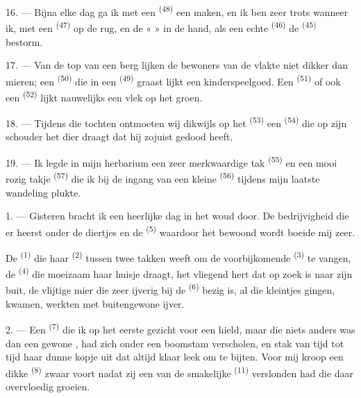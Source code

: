 \VUsaut{3.0mm}

16. --- Bijna elke dag ga ik met een  \textsuperscript{(48)} een
 maken, en ik ben zeer trots wanneer ik, met een 
\textsuperscript{(47)} op de rug, en de «  » in de hand, als een echte
 \textsuperscript{(46)} de  \textsuperscript{(45)} bestorm.

17. --- Van de top van een berg lijken de bewoners van de vlakte niet dikker dan mieren; een
 \textsuperscript{(50)} die in een
 \textsuperscript{(49)} graast lijkt een kinderspeelgoed. Een
 \textsuperscript{(51)} of ook een 
\textsuperscript{(52)} lijkt nauwelijks een vlek op het groen.

18. --- Tijdens die tochten ontmoeten wij dikwijls op het  \textsuperscript{(53)}
een  \textsuperscript{(54)} die op zijn schouder het dier draagt dat hij
zojuist gedood heeft.

19. --- Ik legde in mijn herbarium een zeer merkwaardige tak 
\textsuperscript{(55)} en een mooi rozig takje  \textsuperscript{(57)} die ik
bij de ingang van een kleine  \textsuperscript{(56)} tijdens mijn laatste
wandeling plukte.

\VUsaut{3.0mm}
\VUsaut{3.0mm}

\VUsaut{3.0mm}

1. --- Gisteren bracht ik een heerlijke dag in het woud door. De bedrijvigheid die er heerst
onder de diertjes en de  \textsuperscript{(5)} waardoor het bewoond wordt
boeide mij zeer.

De  \textsuperscript{(1)} die haar  \textsuperscript{(2)} tussen twee
takken weeft om de voorbijkomende
 \textsuperscript{(3)} te vangen, de 
\textsuperscript{(4)} die moeizaam haar huisje draagt, het vliegend hert dat op zoek is naar
zijn buit, de vlijtige mier die zeer ijverig bij de
 \textsuperscript{(6)} bezig is, al die kleintjes gingen,
kwamen, werkten met buitengewone ijver.

2. --- Een  \textsuperscript{(7)} die ik op het eerste gezicht voor een
 hield, maar die niets anders was dan een gewone
, had zich onder een boomstam verscholen, en stak van tijd tot
tijd haar dunne kopje uit dat altijd klaar leek om te bijten. Voor mij kroop een dikke
 \textsuperscript{(8)} zwaar voort nadat zij een van de smakelijke
 \textsuperscript{(11)} verslonden had die daar overvloedig groeien.

